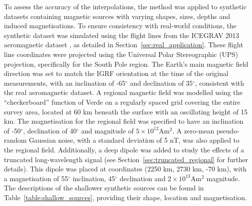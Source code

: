 To assess the accuracy of the interpolations, the method was applied to synthetic datasets containing magnetic sources with varying shapes, sizes, depths and induced magnetisations. To ensure consistency with real-world conditions, the synthetic dataset was simulated using the flight lines from the ICEGRAV 2013 aeromagnetic dataset \citep{ICEGRAV_data}, as detailed in Section~\ref{sec:real_application}. These flight line coordinates were projected using the Universal Polar Stereographic (UPS) projection, specifically for the South Pole region. The Earth's main magnetic field direction was set to match the IGRF orientation at the time of the original measurements, with an inclination of -65$^\circ$ and declination of 35$^\circ$, consistent with the real aeromagnetic dataset. A regional magnetic field was modelled using the ``checkerboard'' function of Verde  \citep{verde} on a regularly spaced grid covering the entire survey area, located at 60 km beneath the surface with an oscillating height of 15 km. The magnetisation for the regional field was specified to have an inclination of -50$^\circ$, declination of 40$^\circ$ and magnitude of $5 \times 10^{12}$Am$^2$. A zero-mean pseudo-random Gaussian noise, with a standard deviation of 5 nT, was also applied to the regional field. Additionally, a deep dipole was added to study the effects of a truncated long-wavelength signal (see Section~\ref{sec:truncated_regional} for further details). This dipole was placed at coordinates (2250 km, 2730 km, -70 km), with a magnetisation of 55$^\circ$ inclination, 45$^\circ$ declination and $2 \times 10^{13}$Am$^2$ magnitude. The descriptions of the shallower synthetic sources can be found in Table~\ref{table:shallow_sources}, providing their shape, location and magnetisation.

